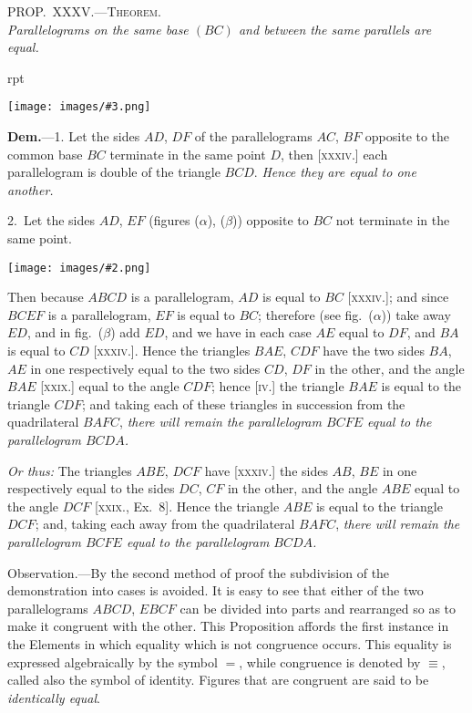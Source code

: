 \documentclass[oneside]{book}
\newcounter{wrapwidth}
\newcommand\myprop[2]{
\bigskip\Needspace*{4\baselineskip}\begin{center}\textsc{#1}\\\medskip\emph{#2}\par\end{center}
}
\newcommand\imgflow[3]{
\setcounter{wrapwidth}{#1}
\begin{wrapfigure}[#2]{r}{\value{wrapwidth}pt}
\begin{center}
\vspace{-0.3in}
\texttt{[image: images/\#3.png]}
\end{center}
\end{wrapfigure}
}
\newcommand\imgcent[2]{
\begin{center}
\texttt{[image: images/\#2.png]}
\end{center}
}
\begin{document}
\myprop{PROP\@.~XXXV\@.---Theorem.}{Parallelograms on the same base $(BC)$ and between the
same parallels are equal.}

\imgflow{175}{8}{f055}

\textbf{Dem.}---1. Let the sides $AD$, $DF$ of the parallelograms
$AC$, $BF$ opposite to the
common base $BC$ terminate
in the same
point $D$, then [\textsc{xxxiv}.]
each parallelogram is
double of the triangle
$BCD$. \emph{Hence they are
equal to one another.}

2.~Let the sides $AD$, $EF$ (figures ($\alpha$), ($\beta$)) opposite
to $BC$ not terminate in the same point.

\imgcent{338}{f056}

Then because $ABCD$ is a parallelogram, $AD$ is equal
to $BC$ [\textsc{xxxiv}.]; and since $BCEF$ is a parallelogram, $EF$
is equal to $BC$; therefore (see fig.~($\alpha$)) take away $ED$,
and in fig.~($\beta$) add $ED$, and we have in each case $AE$
equal to $DF$, and $BA$ is equal to $CD$ [\textsc{xxxiv}.]. Hence
the triangles $BAE$, $CDF$ have the two sides $BA$, $AE$ in
one respectively equal to the two sides $CD$, $DF$ in the
other, and the angle $BAE$ [\textsc{xxix}.] equal to the angle
$CDF$; hence [\textsc{iv}.] the triangle $BAE$ is equal to the triangle
$CDF$; and taking each of these triangles in succession
from the quadrilateral $BAFC$, \emph{there will remain
the parallelogram $BCFE$ equal to the parallelogram $BCDA$.}

\emph{Or thus:} The triangles $ABE$, $DCF$ have [\textsc{xxxiv}.]
the sides $AB$, $BE$ in one respectively equal to the sides
$DC$, $CF$ in the other, and the angle $ABE$ equal to the
angle $DCF$ [\textsc{xxix}., Ex.~8]. Hence the triangle $ABE$ is
equal to the triangle $DCF$; and, taking each away from
the quadrilateral $BAFC$, \emph{there will remain the parallelogram
$BCFE$ equal to the parallelogram $BCDA$.}\par\medskip

\begin{footnotesize}
\textsf{Observation}.---By the second method of proof the subdivision
of the demonstration into cases is avoided. It is easy to see that
either of the two parallelograms $ABCD$, $EBCF$ can be divided
into parts and rearranged so as to make it congruent with the
other. This Proposition affords the first instance in the Elements
in which equality which is not congruence occurs. This equality
is expressed algebraically by the symbol $=$, while congruence
is denoted by $\equiv$, called also the symbol of identity. Figures that
are congruent are said to be \emph{identically equal}.
\par\end{footnotesize}
\end{document}
